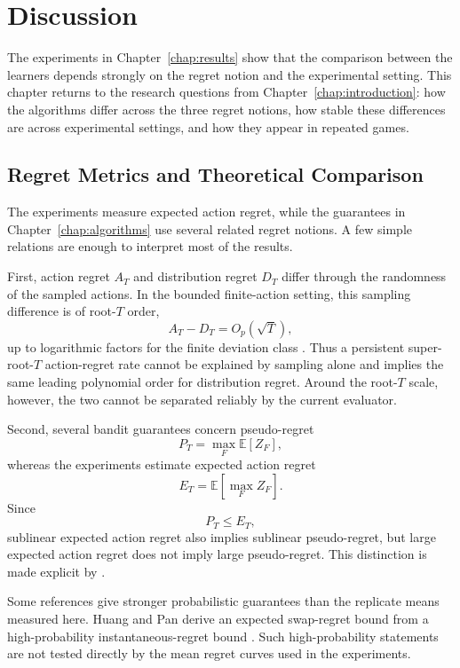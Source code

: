
\chapter{Discussion}
\label{chap:discussion}

The experiments in Chapter~\ref{chap:results} show that the comparison between
the learners depends strongly on the regret notion and the experimental
setting. This chapter returns to the research questions from
Chapter~\ref{chap:introduction}: how the algorithms differ across the three
regret notions, how stable these differences are across experimental settings,
and how they appear in repeated games.

\section{Regret Metrics and Theoretical Comparison}
\label{sec:discussion-theory-and-metrics}

The experiments measure expected action regret, while the guarantees in
Chapter~\ref{chap:algorithms} use several related regret notions. A few simple
relations are enough to interpret most of the results.

First, action regret \(A_T\) and distribution regret \(D_T\) differ through
the randomness of the sampled actions. In the bounded finite-action setting,
this sampling difference is of root-\(T\) order,
\[
    A_T-D_T=O_p(\sqrt{T}),
\]
up to logarithmic factors for the finite deviation class
\citep{greenwald_bounds_2006}. Thus a persistent super-root-\(T\) action-regret
rate cannot be explained by sampling alone and implies the same leading
polynomial order for distribution regret. Around the root-\(T\) scale, however,
the two cannot be separated reliably by the current evaluator.

Second, several bandit guarantees concern pseudo-regret
\[
    P_T=\max_F \mathbb{E}[Z_F],
\]
whereas the experiments estimate expected action regret
\[
    E_T=\mathbb{E}\!\left[\max_F Z_F\right].
\]
Since
\[
    P_T\le E_T,
\]
sublinear expected action regret also implies sublinear pseudo-regret, but large
expected action regret does not imply large pseudo-regret. This distinction is
made explicit by \citet{huang_near-optimal_2023}.

Some references give stronger probabilistic guarantees than the replicate
means measured here. Huang and Pan derive an expected swap-regret bound from
a high-probability instantaneous-regret bound
\citep{huang_near-optimal_2023}. Such high-probability statements are not
tested directly by the mean regret curves used in the experiments.

